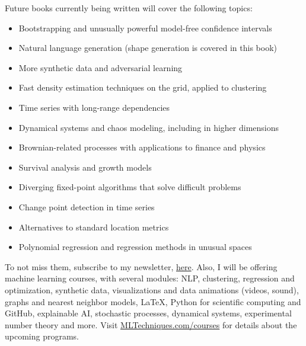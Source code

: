 \documentclass[oneside,10pt]{book}
\begin{document}
\noindent Future books currently being written will cover the following topics: \vspace{1ex}

\begin{itemize}
\item Bootstrapping and unusually powerful model-free confidence intervals
\item Natural language generation (shape generation is covered in this book)
\item More synthetic data and adversarial learning
\item Fast density estimation techniques on the grid, applied to clustering 
\item Time series with long-range dependencies
\item Dynamical systems and chaos modeling, including in higher dimensions
\item Brownian-related processes with applications to finance and physics
\item Survival analysis and growth models
\item Diverging fixed-point algorithms that solve difficult problems
\item Change point detection in time series
\item Alternatives to standard location metrics
\item Polynomial regression and regression methods in unusual spaces
\end{itemize} \vspace{1ex}

\noindent To not miss them, subscribe to my newsletter, \href{https://mltechniques.com/resources/}{here}. Also, I will be offering machine learning courses, with several modules: NLP, clustering, regression and optimization, synthetic data,  
 visualizations and data animations (videos, sound),  graphs and nearest neighbor models, LaTeX,   
  Python for scientific computing and GitHub, explainable AI, stochastic processes, dynamical systems, experimental number theory and more. Visit 
\href{https://mltechniques.com/courses/}{MLTechniques.com/courses} for details about the upcoming programs.

 


\setlength{\glsdescwidth}{0.75\hsize}
\pagebreak
\printnoidxglossary[type=gloss,style=long,title={Glossary},sort=def] %


\printindex

\hypersetup{linkcolor=red} %
\hypersetup{linkcolor=red}
\end{document}
